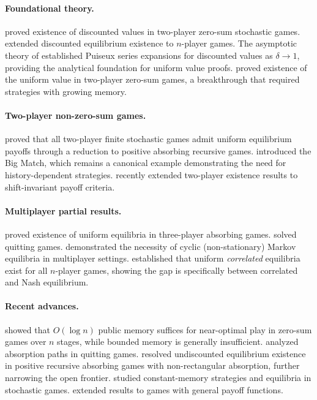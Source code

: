 \documentclass[11pt,a4paper]{article}
\theoremstyle{definition}
\begin{document}
\paragraph{Foundational theory.}
\citet{shapley1953stochastic} proved existence of discounted values in two-player zero-sum stochastic games.
\citet{fink1964equilibrium} extended discounted equilibrium existence to $n$-player games.
The asymptotic theory of \citet{bewley1976stochastic} established Puiseux series expansions for discounted values as $\delta \to 1$, providing the analytical foundation for uniform value proofs.
\citet{mertens1981stochastic,mertens1982stochastic} proved existence of the uniform value in two-player zero-sum games, a breakthrough that required strategies with growing memory.

\paragraph{Two-player non-zero-sum games.}
\citet{vieille2000a,vieille2000b} proved that all two-player finite stochastic games admit uniform equilibrium payoffs through a reduction to positive absorbing recursive games.
\citet{blackwell1968big} introduced the Big Match, which remains a canonical example demonstrating the need for history-dependent strategies.
\citet{flesch2023shift} recently extended two-player existence results to shift-invariant payoff criteria.

\paragraph{Multiplayer partial results.}
\citet{solan1999three} proved existence of uniform equilibria in three-player absorbing games.
\citet{solan2001quitting} solved quitting games.
\citet{flesch1997cyclic} demonstrated the necessity of cyclic (non-stationary) Markov equilibria in multiplayer settings.
\citet{solan2002correlated} established that uniform \emph{correlated} equilibria exist for all $n$-player games, showing the gap is specifically between correlated and Nash equilibrium.

\paragraph{Recent advances.}
\citet{hansen2025limited} showed that $O(\log n)$ public memory suffices for near-optimal play in zero-sum games over $n$ stages, while bounded memory is generally insufficient.
\citet{ashkenazi2023absorption} analyzed absorption paths in quitting games.
\citet{solan2025undiscounted} resolved undiscounted equilibrium existence in positive recursive absorbing games with non-rectangular absorption, further narrowing the open frontier.
\citet{berthon2025constant} studied constant-memory strategies and equilibria in stochastic games.
\citet{flesch2024general} extended results to games with general payoff functions.
\end{document}
